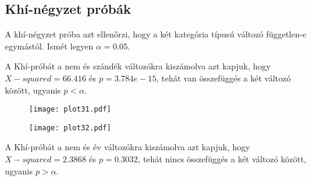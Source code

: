 \documentclass{article}
\begin{document}
\subsection{Khí-négyzet próbák}

A khí-négyzet próba azt ellenőrzi, hogy a két kategória típusú változó független-e egymástól. Ismét legyen $\alpha = 0.05$.

\begin{minipage}{0.45\textwidth}
A Khí-próbát a nem és szándék változókra kiszámolva azt kapjuk, hogy $X-squared = 66.416$ és $p = 3.784e-15$, tehát van összefüggés a két változó között, ugyanis $p < \alpha$.
\end{minipage}
\begin{minipage}{0.5\textwidth}
\begin{figure}[H]
\texttt{[image: plot31.pdf]}
\end{figure}
\end{minipage} \hfill


\begin{minipage}{0.5\textwidth}
\begin{figure}[H]
\texttt{[image: plot32.pdf]}
\end{figure}
\end{minipage} \hfill
\begin{minipage}{0.45\textwidth}
A Khí-próbát a nem és év változókra kiszámolva azt kapjuk, hogy $X-squared = 2.3868$ és $p = 0.3032$, tehát nincs összefüggés a két változó között, ugyanis $p > \alpha$.
\end{minipage}

\newpage
\tableofcontents
\end{document}
